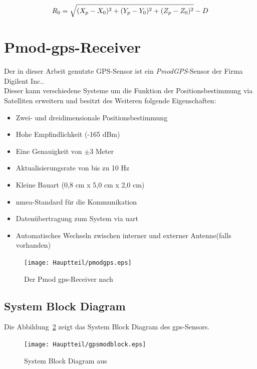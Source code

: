 \begin{equation*}
R_{0}=\sqrt{ (X_{p}-X_{0})^2+(Y_{p}-Y_{0})^2+(Z_{p}-Z_{0})^2}-D\\
\end{equation*}

\newpage
\section{Pmod-\ac{gps}-Receiver}\label{kap:gpsreceiver}


Der in dieser Arbeit genutzte GPS-Sensor ist ein \emph{PmodGPS}-Sensor der Firma Digilent Inc..\\
Dieser kann verschiedene Systeme um die Funktion der Positionsbestimmung via Satelliten erweitern und
besitzt des Weiteren folgende Eigenschaften:\cite{pmodgpsman}\\
\begin{itemize}
\item Zwei- und dreidimensionale Positionsbestimmung
\item Hohe Empfindlichkeit (-165 dBm)
\item Eine Genauigkeit von \(\pm\)3 Meter
\item Aktualisierungsrate von bis zu 10 Hz
\item Kleine Bauart (0,8 cm x 5,0 cm x 2,0 cm)
\item \ac{nmea}-Standard für die Kommunikation
\item Datenübertragung zum System via \ac{uart}
\item Automatisches Wechseln zwischen interner und externer Antenne(falls vorhanden)
\end{itemize}

\begin{figure}[h!]
\centering
\texttt{[image: Hauptteil/pmodgps.eps]}
\caption{Der Pmod \ac{gps}-Receiver nach \cite{pmodgpsman} }
\label{fig:pmodgpsman}
\end{figure}


\subsection{System Block Diagram}\label{kap:gpsblock}


Die Abbildung~\ref{fig:gpsmodblock} zeigt das System Block Diagram des \ac{gps}-Sensors.\\

\begin{figure}[h!]
\centering
\texttt{[image: Hauptteil/gpsmodblock.eps]}
\caption{System Block Diagram aus \cite{pmodgpsman} }
\label{fig:gpsmodblock}
\end{figure}


